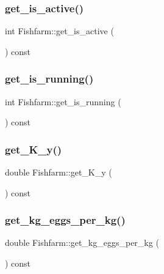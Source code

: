 \mbox{\label{class_fishfarm_ad51a326fc6c04c2015a34de9f53d90be}} 
\subsubsection{\texorpdfstring{get\_is\_active()}{get\_is\_active()}}
{\footnotesize\ttfamily int Fishfarm\+::get\+\_\+is\+\_\+active (\begin{DoxyParamCaption}{ }\end{DoxyParamCaption}) const}

\mbox{\label{class_fishfarm_abfbd7625dd947af136ced45817318a7b}} 
\subsubsection{\texorpdfstring{get\_is\_running()}{get\_is\_running()}}
{\footnotesize\ttfamily int Fishfarm\+::get\+\_\+is\+\_\+running (\begin{DoxyParamCaption}{ }\end{DoxyParamCaption}) const}

\mbox{\label{class_fishfarm_a5eb4a94c070b4d4a44ced1b6ae7cbd2f}} 
\subsubsection{\texorpdfstring{get\_K\_y()}{get\_K\_y()}}
{\footnotesize\ttfamily double Fishfarm\+::get\+\_\+\+K\+\_\+y (\begin{DoxyParamCaption}{ }\end{DoxyParamCaption}) const}

\mbox{\label{class_fishfarm_aeb602bf440eafa1459146cc06b277255}} 
\subsubsection{\texorpdfstring{get\_kg\_eggs\_per\_kg()}{get\_kg\_eggs\_per\_kg()}}
{\footnotesize\ttfamily double Fishfarm\+::get\+\_\+kg\+\_\+eggs\+\_\+per\+\_\+kg (\begin{DoxyParamCaption}{ }\end{DoxyParamCaption}) const}

